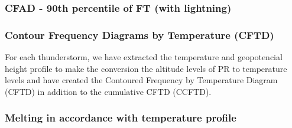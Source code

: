 \documentclass[smaller]{beamer}
\begin{document}
\begin{frame}
\frametitle{CFAD - 90th percentile of FT (with lightning)}

\end{frame}




\begin{frame}
\frametitle{Contour Frequency Diagrams by Temperature (CFTD)}
For each thunderstorm, we have extracted the temperature and
geopotencial height profile to make the conversion the altitude levels of PR to temperature levels and have created the Contoured Frequency by Temperature Diagram (CFTD) in addition to the cumulative CFTD (CCFTD).
\end{frame}


\begin{frame}
\frametitle{Melting in accordance with temperature profile}
\end{frame} 



\end{document}
